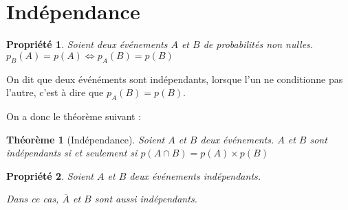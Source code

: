 \documentclass[12pt,a4paper]{article}
\theoremstyle{break}
\newtheorem{propriete}{Propriété}
\newtheorem{theoreme}{Théorème}
\theoremstyle{plain}
\theoremstyle{nonumberplain}
\theoremstyle{nonumberbreak}
\begin{document}


\pagebreak

\section{Indépendance}

\begin{propriete}
  Soient deux événements $A$ et $B$ de probabilités non nulles.
  $p_B(A) = p(A) \iff p_A(B) = p(B)$
\end{propriete}


On dit que deux événéments sont indépendants, lorsque l'un ne
conditionne pas l'autre, c'est à dire que $p_A(B) = p(B)$.

On a donc le théorème suivant :

\begin{theoreme}[Indépendance]
  Soient $A$ et $B$ deux événements. $A$ et $B$ sont indépendants si et
  seulement si $p(A\cap B) = p(A)\times p(B)$
\end{theoreme}

\begin{propriete}
  Soient $A$ et $B$ deux événements indépendants.

  Dans ce cas, $\overline{A}$ et $B$ sont aussi indépendants.
\end{propriete}

\end{document}
